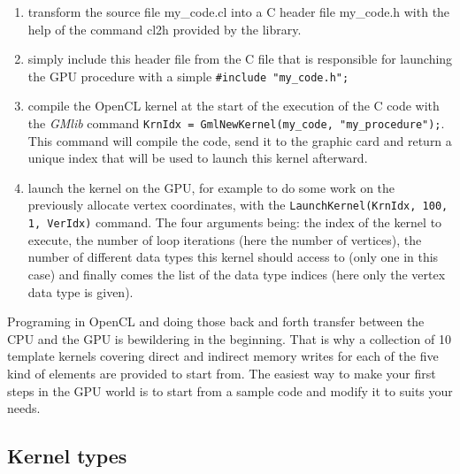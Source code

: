 \documentclass[a4paper,12pt]{article}
\begin{document}
\begin{enumerate}
\item transform the source file my\_code.cl into a C header file my\_code.h with the help of the command cl2h provided by the library.
\item simply include this header file from the C file that is responsible for launching the GPU procedure with a simple
 {\tt \#include "my\_code.h";}
\item compile the OpenCL kernel at the start of the execution of the C code with the \emph{GMlib} command {\tt KrnIdx = GmlNewKernel(my\_code, "my\_procedure");}. This command will compile the code, send it to the graphic card and return a unique index that will be used to launch this kernel afterward.
\item launch the kernel on the GPU, for example to do some work on the previously allocate vertex coordinates, with the {\tt LaunchKernel(KrnIdx, 100, 1, VerIdx)} command. The four arguments being: the index of the kernel to execute, the number of loop iterations (here the number of vertices), the number of different data types this kernel should access to (only one in this case) and finally comes the list of the data type indices (here only the vertex data type is given).
\end{enumerate}

Programing in OpenCL and doing those back and forth transfer between the CPU and the GPU is bewildering in the beginning. That is why a collection of 10 template kernels covering direct and indirect memory writes for each of the five kind of elements are provided to start from. The easiest way to make your first steps in the GPU world is to start from a sample code and modify it to suits your needs.

\subsection{Kernel types}
\end{document}
